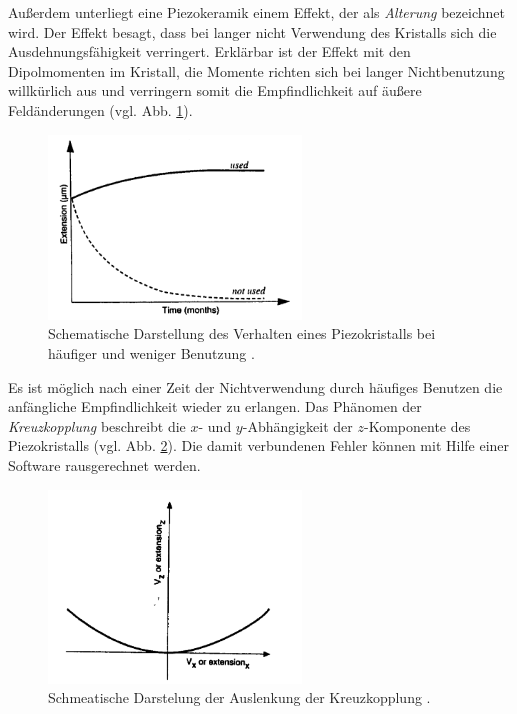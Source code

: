 Außerdem unterliegt eine Piezokeramik einem Effekt, der als \emph{Alterung} bezeichnet wird. Der Effekt besagt,
dass bei langer nicht Verwendung des Kristalls sich die Ausdehnungsfähigkeit verringert. Erklärbar ist der Effekt mit den %
Dipolmomenten im Kristall, die Momente richten sich bei langer Nichtbenutzung willkürlich aus und verringern %
somit die Empfindlichkeit auf äußere Feldänderungen (vgl. Abb. \ref{fig: ageing}).
\begin{figure}[!h]
  \centering
  \includegraphics[width=0.6\textwidth]{./pics/ageing.png}
  \caption{Schematische Darstellung des Verhalten eines Piezokristalls bei häufiger und weniger Benutzung \cite{rtm}.} %
  \label{fig: ageing}
\end{figure}
Es ist möglich nach einer Zeit der Nichtverwendung
durch häufiges Benutzen die anfängliche Empfindlichkeit wieder zu erlangen.
Das Phänomen der \emph{Kreuzkopplung} beschreibt die $x$- und $y$-Abhängigkeit der $z$-Komponente des Piezokristalls (vgl. Abb. \ref{fig: cross_copeling}). %
Die damit verbundenen Fehler können mit Hilfe einer Software rausgerechnet werden. %
\begin{figure}[!h]
  \centering
  \includegraphics[width=0.6\textwidth]{./pics/cross_copling.png}
  \caption{Schmeatische Darstelung der Auslenkung der Kreuzkopplung \cite{rtm}.}
  \label{fig: cross_copeling}
\end{figure}

